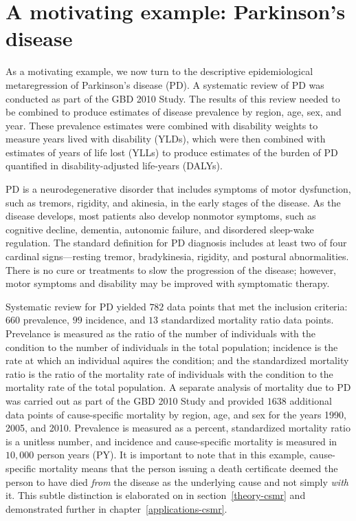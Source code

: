 \section{A motivating example: Parkinson's disease}
\label{intro-complete_ex}

As a motivating example, we now turn to the descriptive
epidemiological metaregression of Parkinson's disease (PD). A
systematic review of PD was conducted as part of the GBD 2010
Study.\cite{vos_global_2012} The results of this
review needed to be combined to produce estimates of disease prevalence by
region, age, sex, and year.  These prevalence estimates were combined
with disability weights to measure years lived with disability (YLDs),
which were then combined with estimates of years of life lost (YLLs)
to produce estimates of the burden of PD quantified in disability-adjusted life-years (DALYs).

PD is a neurodegenerative disorder that includes symptoms of motor
dysfunction, such as tremors, rigidity, and akinesia, in the early
stages of the disease.  As the disease develops, most patients also
develop nonmotor symptoms, such as cognitive decline, dementia,
autonomic failure, and disordered sleep-wake regulation.  The standard
definition for PD diagnosis includes at least two of four cardinal
signs---resting tremor, bradykinesia, rigidity, and postural abnormalities.
There is no cure or treatments to slow the progression of the disease;
however, motor symptoms and disability may be improved with
symptomatic therapy.\cite{poewe_natural_2006, pollock_prevalence_1966, larsen_clinical_1994}

Systematic review for PD yielded $782$ data points that met the inclusion criteria: $660$
prevalence, $99$ incidence, and $13$ standardized mortality ratio data
points.  Prevelance is measured as the ratio of the number of individuals with the condition to 
the number of individuals in the total population; incidence is the rate at which
an individual aquires the condition; and the standardized mortality ratio is the
ratio of the mortality rate of individuals with the condition to the 
mortality rate of the total population.  A separate analysis of
mortality due to PD was carried out as part of the GBD 2010 Study and
provided $1638$ additional data points of cause-specific mortality by
region, age, and sex for the years 1990, 2005, and 2010.  Prevalence
is measured as a percent, standardized mortality ratio is a unitless number, and
incidence and cause-specific mortality is measured in $10,000$ person
years (PY).  It is important to note that in this example, cause-specific mortality means
that the person issuing a death certificate deemed the person to
have died \emph{from} the disease as the underlying cause and not
simply \emph{with} it.  This subtle distinction is elaborated on in
section~\ref{theory-csmr} and demonstrated further in
chapter~\ref{applications-csmr}.

